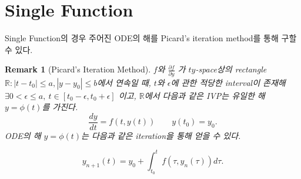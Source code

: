\documentclass[a4paper,10pt]{article}
\newtheorem*{remark}{Remark}
\begin{document}
    \section{Single Function}
    Single Function의 경우 주어진 ODE의 해를 Picard's iteration method를 통해 구할 수 있다.
    \begin{remark}[Picard's Iteration Method]
    $f$와 $\displaystyle{\frac{\partial f}{\partial y}}$ 가 $ty$-space상의 rectangle $\mathbb{R}: |t - t_0| \leq a, |y - y_0| \leq b$에서 연속일 때, $t$와 $\epsilon$에 관한 적당한 interval이 존재해 $\exists 0 < \epsilon \leq a, \ t \in [t_0 - \epsilon, t_0 + \epsilon]$ 이고, $\mathbb{R}$에서 다음과 같은 IVP는 유일한 해 $y = \phi(t)$를 가진다.
    \begin{displaymath}
        \frac{dy}{dt} = f(t, y(t)) \qquad y(t_0) = y_0.
    \end{displaymath}
    ODE의 해 $y = \phi(t)$는 다음과 같은 iteration을 통해 얻을 수 있다.
    
    \begin{displaymath}
        y_{n+1}(t) = y_0 + \int_{t_0}^{t} f(\tau , y_n(\tau)) d \tau.
    \end{displaymath}
    \end{remark}
    
\end{document}

